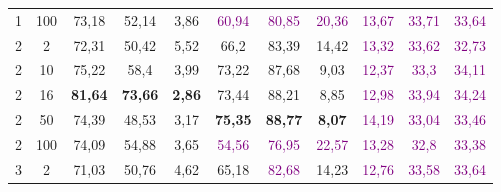 \begin{table}[ht]
\begin{tabular}{cc|ccc|ccc|ccc}
        {1}                           & {100}  & {73,18}                             & {52,14}                             & {3,86}                                   & \textcolor{purple}{60,94} & \textcolor{purple}{80,85} & \textcolor{purple}{20,36} & \textcolor{purple}{13,67} & \textcolor{purple}{33,71} & \textcolor{purple}{33,64} \\
        {2}                           & {2}    & {72,31}                             & {50,42}                             & {5,52}                                   & {66,2}                    & {83,39}                   & {14,42}                   & \textcolor{purple}{13,32} & \textcolor{purple}{33,62} & \textcolor{purple}{32,73} \\
        {2}                           & {10}   & {75,22}                             & {58,4}                              & {3,99}                                   & {73,22}                   & {87,68}                   & {9,03}                    & \textcolor{purple}{12,37} & \textcolor{purple}{33,3}  & \textcolor{purple}{34,11} \\
        {2}                           & {16}   & {\textbf{81,64}}                    & {\textbf{73,66}}                    & {\textbf{2,86}}                          & {73,44}                   & {88,21}                   & {8,85}                    & \textcolor{purple}{12,98} & \textcolor{purple}{33,94} & \textcolor{purple}{34,24} \\
        {2}                           & {50}   & {74,39}                             & {48,53}                             & {3,17}                                   & {\textbf{75,35}}          & \textbf{88,77}            & \textbf{8,07}             & \textcolor{purple}{14,19} & \textcolor{purple}{33,04} & \textcolor{purple}{33,46} \\
        {2}                           & {100}  & {74,09}                             & {54,88}                             & {3,65}                                   & \textcolor{purple}{54,56} & \textcolor{purple}{76,95} & \textcolor{purple}{22,57} & \textcolor{purple}{13,28} & \textcolor{purple}{32,8}  & \textcolor{purple}{33,38} \\
        {3}                           & {2}    & {71,03}                             & {50,76}                             & {4,62}                                   & {65,18}                   & \textcolor{purple}{82,68} & {14,23}                   & \textcolor{purple}{12,76} & \textcolor{purple}{33,58} & \textcolor{purple}{33,64} \\

\end{tabular}
\end{table}
